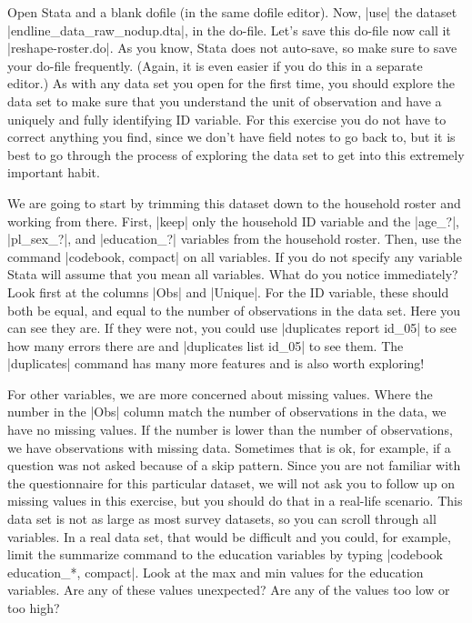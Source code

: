 \documentclass{tufte-handout}
\begin{document}
Open Stata and a blank dofile (in the same dofile editor).
Now, |use| the dataset |endline_data_raw_nodup.dta|, in the do-file.
Let’s save this do-file now call it |reshape-roster.do|.
As you know, Stata does not auto-save,
so make sure to save your do-file frequently.
(Again, it is even easier if you do this in a separate editor.)
As with any data set you open for the first time,
you should explore the data set to make sure that you understand
the unit of observation and have a uniquely and fully identifying ID variable.
For this exercise you do not have to correct anything you find,
since we don't have field notes to go back to,
but it is best to go through the process of exploring the data set
to get into this extremely important habit.

We are going to start by trimming this dataset
down to the household roster and working from there.
First, |keep| only the household ID variable and the
|age_?|, |pl_sex_?|, and |education_?| variables from the household roster.
Then, use the command |codebook, compact| on all variables.
If you do not specify any variable Stata will assume that you mean all variables.
What do you notice immediately?
Look first at the columns |Obs| and |Unique|.
For the ID variable, these should both be equal,
and equal to the number of observations in the data set.
Here you can see they are. If they were not,
you could use |duplicates report id_05|
to see how many errors there are and |duplicates list id_05| to see them.
The |duplicates| command has many more features and is also worth exploring!

For other variables, we are more concerned about missing values.
Where the number in the |Obs| column match the number of observations in the data,
we have no missing values.
If the number is lower than the number of observations,
we have observations with missing data.
Sometimes that is ok, for example, if a question was not asked
because of a skip pattern.
Since you are not familiar with the questionnaire for this particular dataset,
we will not ask you to follow up on missing values in this exercise,
but you should do that in a real-life scenario.
This data set is not as large as most survey datasets,
so you can scroll through all variables.
In a real data set, that would be difficult and you could, for example,
limit the summarize command to the education variables by typing
|codebook education_*, compact|.
Look at the max and min values for the education variables.
Are any of these values unexpected? Are any of the values too low or too high?
\end{document}
